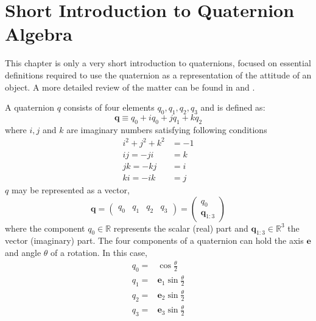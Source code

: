 \section{Short Introduction to Quaternion Algebra}\label{sec:quaternion-intro}

\iffalse
There is a substantial body of quaternion mathematics that are beyond
the scope of this report. Consequently, we focus on the
essential definitions required to use the quaternion as a
representation of the attitude of an object.
\fi
This chapter is only a very short introduction to quaternions, focused on 
essential definitions required to use the quaternion as a
representation of the attitude of an object. A more detailed review of the 
matter can be found in \cite{Markley2019} and \cite{Diebel2006}.

A quaternion $q$ consists of four elements $q_0, q_1, q_2, q_3$ and is defined as:
\begin{equation}
  \bm{q} \equiv q_0 + i q_0 + j q_1 + k q_2
\end{equation}
where $i, j$ and $k$ are imaginary numbers satisfying following conditions
\begin{equation}
  \begin{aligned}
    i^2 + j^2 + k^2 &= -1 \\
    ij = -ji &= k \\ 
    jk=-kj &= i \\
    ki=-ik &= j
  \end{aligned}
\end{equation}
$q$ may be represented as a vector,
\begin{equation}
  \bm{q} = \begin{pmatrix} q_0 & q_1 & q_2 & q_3 \end{pmatrix} = \begin{pmatrix} q_0 \\ \bm{q}_{1:3} \end{pmatrix}
\end{equation}
where the component $q_0 \in \mathbb{R}$ represents the scalar (real) part and 
$\bm{q}_{1:3} \in \mathbb{R}^3$ the vector (imaginary) part. The four components 
of a quaternion can hold the axis $\bm{e}$ and angle $\theta$ of a rotation. 
In this case, 
\begin{equation}
  \begin{aligned}
    q_0 = & \cos \frac{\theta}{2} \\
    q_1 = & \bm{e}_1 \sin \frac{\theta}{2} \\
    q_2 = & \bm{e}_2 \sin \frac{\theta}{2} \\
    q_3 = & \bm{e}_3 \sin \frac{\theta}{2}
  \end{aligned}
\end{equation}

